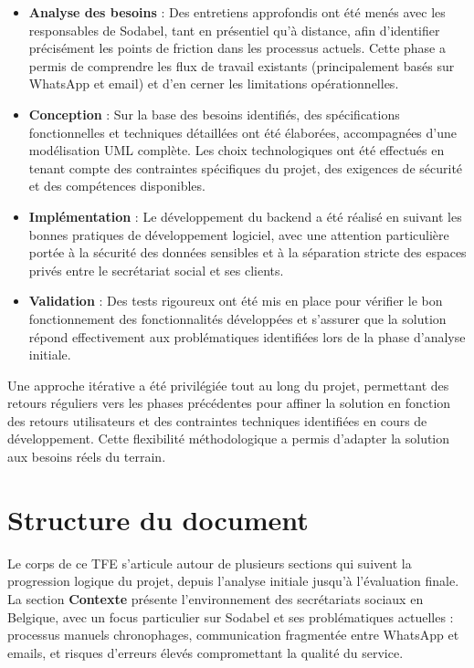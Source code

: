 \begin{itemize}[leftmargin=*,label=\textcolor{darkgray}{$\bullet$},itemsep=0.3em]
  \item \textbf{Analyse des besoins} : Des entretiens approfondis ont été menés avec les responsables de Sodabel, tant en présentiel qu'à distance, afin d'identifier précisément les points de friction dans les processus actuels. Cette phase a permis de comprendre les flux de travail existants (principalement basés sur WhatsApp et email) et d'en cerner les limitations opérationnelles.

  \item \textbf{Conception} : Sur la base des besoins identifiés, des spécifications fonctionnelles et techniques détaillées ont été élaborées, accompagnées d'une modélisation UML complète. Les choix technologiques ont été effectués en tenant compte des contraintes spécifiques du projet, des exigences de sécurité et des compétences disponibles.

  \item \textbf{Implémentation} : Le développement du backend a été réalisé en suivant les bonnes pratiques de développement logiciel, avec une attention particulière portée à la sécurité des données sensibles et à la séparation stricte des espaces privés entre le secrétariat social et ses clients.

  \item \textbf{Validation} : Des tests rigoureux ont été mis en place pour vérifier le bon fonctionnement des fonctionnalités développées et s'assurer que la solution répond effectivement aux problématiques identifiées lors de la phase d'analyse initiale.
\end{itemize}

\begin{note}
Une approche itérative a été privilégiée tout au long du projet, permettant des retours réguliers vers les phases précédentes pour affiner la solution en fonction des retours utilisateurs et des contraintes techniques identifiées en cours de développement. Cette flexibilité méthodologique a permis d'adapter la solution aux besoins réels du terrain.
\end{note}

\section{Structure du document}

Le corps de ce TFE s'articule autour de plusieurs sections qui suivent la progression logique du projet, depuis l'analyse initiale jusqu'à l'évaluation finale.
\noindent La section \textbf{Contexte} présente l'environnement des secrétariats sociaux en Belgique, avec un focus particulier sur Sodabel et ses problématiques actuelles : processus manuels chronophages, communication fragmentée entre WhatsApp et emails, et risques d'erreurs élevés compromettant la qualité du service.

